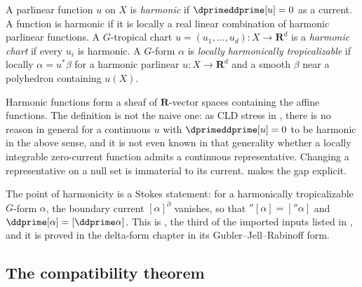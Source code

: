 \begin{definition}
\label{def:ch16-harmonic-function}
A parlinear function $u$ on $X$ is \emph{harmonic} if $\dprimeddprime[u]=0$
as a current.  A function is harmonic if it is locally a real linear
combination of harmonic parlinear functions.  A $G$-tropical chart
$u=(u_1,\ldots,u_d):X\to\mathbf R^d$ is a \emph{harmonic chart} if every
$u_i$ is harmonic.  A $G$-form $\alpha$ is \emph{locally harmonically
tropicalizable} if locally $\alpha=u^*\beta$ for a harmonic parlinear
$u:X\to\mathbf R^d$ and a smooth $\beta$ near a polyhedron containing
$u(X)$.
\end{definition}

Harmonic functions form a sheaf of $\mathbf R$-vector spaces containing the
affine functions.  The definition is not the naive one: as CLD stress in
\cite[Remark~7.8.3]{CLD25}, there is no reason in general for a continuous
$u$ with $\dprimeddprime[u]=0$ to be harmonic in the above sense, and it is
not even known in that generality whether a locally integrable
zero-current function admits a continuous representative.  Changing a
representative on a null set is immaterial to its current.   makes the gap explicit.

The point of harmonicity is a Stokes statement: for a harmonically
tropicalizable $G$-form $\alpha$, the boundary current $[\alpha]^\partial$
vanishes, so that $\dprime[\alpha]=[\dprime\alpha]$ and
$\ddprime[\alpha]=[\ddprime\alpha]$.  This is
\cite[Theorem~7.8.5 and Corollary~7.8.8]{CLD25}, the third of the imported
inputs listed in , and it is proved in the
delta-form chapter  in its Gubler--Jell--Rabinoff
form.

\subsection{The compatibility theorem}
\label{sec:ch16-harmonic-compatibility}

